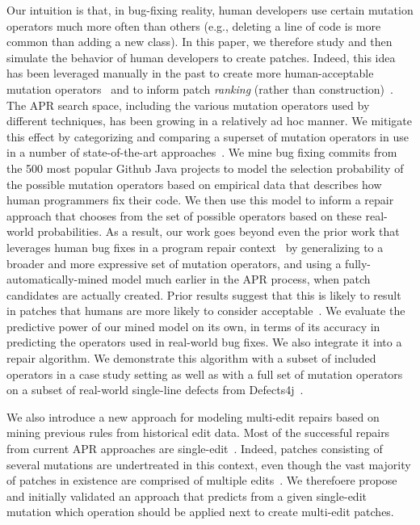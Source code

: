 \documentclass[conference]{IEEEtran}
\begin{document}
Our intuition is that, in bug-fixing reality, human developers use certain mutation operators 
much more often than 
others (e.g., deleting a line of code is more common than adding a
new class). In this paper, we therefore study and then simulate the behavior of human
developers to create patches. 
Indeed, this idea has been
leveraged manually in the past to create more human-acceptable mutation
operators~\cite{kim2013} and to inform patch \emph{ranking} (rather than construction)~\cite{xuan16,Long2016}.
The APR search space, including the various mutation
operators used by different techniques, has been growing in a relatively ad hoc 
manner. We mitigate this effect by categorizing and comparing a superset of
mutation operators in use in a number of 
state-of-the-art approaches~\cite{legoues12,Weimer13,kim2013,Long2016}.
We mine bug fixing commits from 
the 500 most popular Github Java projects to model the selection probability of
the possible mutation operators based on 
empirical data that describes how human programmers fix their code.  We then use this
model to inform a repair approach that chooses from the set of possible
operators based on these real-world
probabilities.
As a result, our work goes beyond even the prior work that leverages human bug
fixes in a program repair context~\cite{kim2013,xuan16,Long2016} by generalizing
to a broader and more expressive set of
mutation operators, and using a fully-automatically-mined model much 
earlier in the APR process, when
patch candidates are actually created.  Prior results suggest that this is likely to result in patches that
humans are more likely to consider acceptable~\cite{kim2013}.
%
We evaluate the predictive power of our mined model on its own, in terms of its
accuracy in predicting the operators used in real-world bug fixes.  We also
integrate it into a repair algorithm. We demonstrate this algorithm with a
subset of included operators in 
a case study setting as well as with a full set of mutation
operators on a subset of real-world single-line defects
from Defects4j~\cite{just14}. 

We also introduce a new approach for modeling multi-edit repairs based on
mining previous rules from historical edit data. Most of the
successful repairs from current APR approaches are
single-edit~\cite{Weimer13,Qi15,kim2013,arcuri11}.  
%
Indeed, patches
consisting of several mutations are undertreated in this context, even though the vast majority
of patches in existence are comprised of multiple edits~\cite{Soto15,zhong15}.
We therefoere
 propose and initially validated an approach that predicts from a given 
single-edit mutation which operation should be applied
next to create multi-edit patches. 
\end{document}
